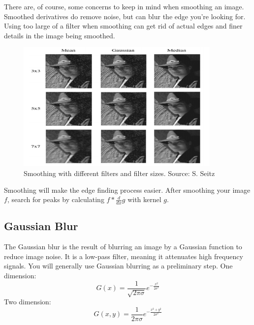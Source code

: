\documentclass{article}
\begin{document}
There are, of course, some concerns to keep in mind when smoothing an image. Smoothed derivatives do remove noise, but can blur the edge you're looking for. Using too large of a filter when smoothing can get rid of actual edges and finer details in the image being smoothed.

\begin{figure}[H]
\caption{Smoothing with different filters and filter sizes. Source: S. Seitz}
\centering
\includegraphics[width=10cm]{seitz_smoothing.png}
\end{figure}


Smoothing will make the edge finding process easier. After smoothing your image $f$, search for peaks by calculating $f * \frac{d}{dx}g$ with kernel $g$.

\subsection{Gaussian Blur}

The Gaussian blur is the result of blurring an image by a Gaussian function to reduce image noise. It is a low-pass filter, meaning it attenuates high frequency signals. You will generally use Gaussian blurring as a preliminary step.
\newline
One dimension:
$$G(x) = \frac{1}{\sqrt{2\pi\sigma}}e^{-\frac{x^2}{2\sigma^2}}$$
Two dimension:
$$G(x,y) = \frac{1}{2\pi\sigma}e^{-\frac{x^2+y^2}{2\sigma^2}}$$
\end{document}
